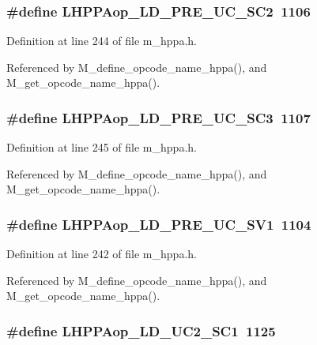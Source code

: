 \subsubsection{\setlength{\rightskip}{0pt plus 5cm}\#define LHPPAop\_\-LD\_\-PRE\_\-UC\_\-SC2~1106}\label{m__hppa_8h_45123ba3fe21658a938ff5bb87b1f897}




Definition at line 244 of file m\_\-hppa.h.

Referenced by M\_\-define\_\-opcode\_\-name\_\-hppa(), and M\_\-get\_\-opcode\_\-name\_\-hppa().
\subsubsection{\setlength{\rightskip}{0pt plus 5cm}\#define LHPPAop\_\-LD\_\-PRE\_\-UC\_\-SC3~1107}\label{m__hppa_8h_8b0c985b57e981878b2d9158eb8aaba7}




Definition at line 245 of file m\_\-hppa.h.

Referenced by M\_\-define\_\-opcode\_\-name\_\-hppa(), and M\_\-get\_\-opcode\_\-name\_\-hppa().
\subsubsection{\setlength{\rightskip}{0pt plus 5cm}\#define LHPPAop\_\-LD\_\-PRE\_\-UC\_\-SV1~1104}\label{m__hppa_8h_44ca93bb0b7c5cefec1f01edd6a5790e}




Definition at line 242 of file m\_\-hppa.h.

Referenced by M\_\-define\_\-opcode\_\-name\_\-hppa(), and M\_\-get\_\-opcode\_\-name\_\-hppa().
\subsubsection{\setlength{\rightskip}{0pt plus 5cm}\#define LHPPAop\_\-LD\_\-UC2\_\-SC1~1125}\label{m__hppa_8h_065160d1306bdd7ae2029be5e92af4ad}




